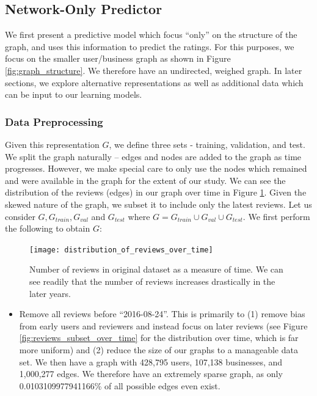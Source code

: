 \documentclass[letterpaper, 10 pt, conference]{ieeeconf}  %
\begin{document}
\subsection{Network-Only Predictor}
We first present a predictive model which focus ``only'' on the structure of the graph, and uses this information to predict the ratings. For this purposes, we focus on the smaller user/business graph as shown in Figure \ref{fig:graph_structure}. We therefore have an undirected, weighed graph. In later sections, we explore alternative representations as well as additional data which can be input to our learning models.


\subsubsection{Data Preprocessing}
Given this representation $G$, we define three sets - training, validation, and test. We split the graph naturally -- edges and nodes are added to the graph as time progresses. However, we make special care to only use the nodes which remained and were available in the graph for the extent of our study. We can see the distribution of the reviews (edges) in our graph over time in Figure \ref{fig:reviews_over_time}. Given the skewed nature of the graph, we subset it to include only the latest reviews. Let us consider $G, G_{train}, G_{val}$ and $G_{test}$ where $G = G_{train} \cup G_{val} \cup G_{test}$. We first perform the following to obtain $G$:

\begin{figure}[h!]
\centering
\texttt{[image: distribution\_of\_reviews\_over\_time]}
\caption{Number of reviews in original dataset as a measure of time. We can see readily that the number of reviews increases drastically in the later years.}
\label{fig:reviews_over_time}
\end{figure}

\begin{itemize}
\item Remove all reviews before ``2016-08-24''. This is primarily to (1) remove bias from early users and reviewers and instead focus on later reviews (see Figure \ref{fig:reviews_subset_over_time} for the distribution over time, which is far more uniform) and (2) reduce the size of our graphs to a manageable data set. We then have a graph with 428,795 users, 107,138 businesses, and 1,000,277 edges. We therefore have an extremely sparse graph, as only 0.0103109977941166\% of all possible edges even exist.
\end{itemize}
\end{document}
